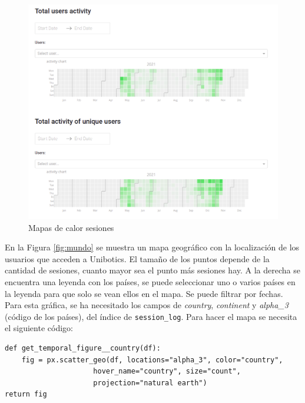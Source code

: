 \begin{figure}[H]
    \centering
    \includegraphics[width=17cm, keepaspectratio]{img/activity.png}
    \caption{Mapas de calor sesiones}
    \label{fig:activity}
\end{figure}
\newpage
En la Figura \ref{fig:mundo} se muestra un mapa geográfico con la localización de los usuarios que acceden a Unibotics. El tamaño de los puntos depende de la cantidad de sesiones, cuanto mayor sea el punto más sesiones hay. A la derecha se encuentra una leyenda con los países, se puede seleccionar uno o varios países en la leyenda para que solo se vean ellos en el mapa. Se puede filtrar por fechas. Para esta gráfica, se ha necesitado los campos de \textit{country}, \textit{continent} y \textit{alpha\_3} (código de los países), del índice de \texttt{session\_log}. Para hacer el mapa se necesita el siguiente código:
\begin{verbatim}
def get_temporal_figure__country(df):
    fig = px.scatter_geo(df, locations="alpha_3", color="country",
                     hover_name="country", size="count",
                     projection="natural earth")
return fig
\end{verbatim}


